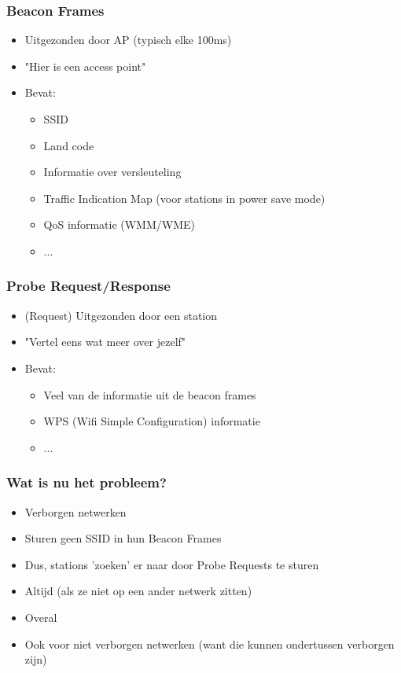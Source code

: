 \documentclass{beamer}
\begin{document}
  \begin{frame}
    \frametitle{Beacon Frames}
    \begin{itemize}
      \item Uitgezonden door AP (typisch elke 100ms)
      \item "Hier is een access point"
      \item Bevat:
        \begin{itemize}
          \item SSID
          \item Land code
          \item Informatie over versleuteling
          \item Traffic Indication Map (voor stations in power save mode)
          \item QoS informatie (WMM/WME)
          \item ...
        \end{itemize}
    \end{itemize}
  \end{frame}

  \begin{frame}
    \frametitle{Probe Request/Response}
    \begin{itemize}
      \item (Request) Uitgezonden door een station
      \item "Vertel eens wat meer over jezelf"
      \item Bevat:
        \begin{itemize}
          \item Veel van de informatie uit de beacon frames
          \item WPS (Wifi Simple Configuration) informatie
          \item ...
        \end{itemize}
    \end{itemize}
  \end{frame}

  \begin{frame}
    \frametitle{Wat is nu het probleem?}

    \begin{itemize}
      \item Verborgen netwerken
      \item Sturen geen SSID in hun Beacon Frames
      \item Dus, stations 'zoeken' er naar door Probe Requests te sturen
        \pause
      \item Altijd (als ze niet op een ander netwerk zitten)
      \item Overal
        \pause
      \item Ook voor niet verborgen netwerken (want die kunnen ondertussen verborgen zijn)
    \end{itemize}
  \end{frame}
\end{document}
